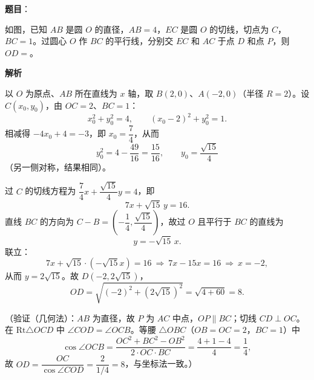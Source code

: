 \begin{answer}

\textbf{题目}：

如图，已知 \(AB\) 是圆 \(O\) 的直径，\(AB=4\)，\(EC\) 是圆 \(O\) 的切线，切点为 \(C\)，\(BC=1\)。过圆心 \(O\) 作 \(BC\) 的平行线，分别交 \(EC\) 和 \(AC\) 于点 \(D\) 和点 \(P\)，则 \(OD=\)\gkblank{}。
\nopagebreak[4]
\begin{center}\end{center}
\nopagebreak[4]
\textbf{解析}

以 \(O\) 为原点、\(AB\) 所在直线为 \(x\) 轴，取 \(B(2,0)\)、\(A(-2,0)\)（半径 \(R=2\)）。设 \(C(x_0,y_0)\)，由 \(OC=2\)、\(BC=1\)：
\nopagebreak[4]
\[
x_0^2+y_0^2=4,\qquad (x_0-2)^2+y_0^2=1.
\]
相减得 \(-4x_0+4=-3\)，即 \(x_0=\dfrac74\)，从而
\nopagebreak[4]
\[
y_0^2=4-\frac{49}{16}=\frac{15}{16},\qquad y_0=\frac{\sqrt{15}}{4}
\]
（另一侧对称，结果相同）。

过 \(C\) 的切线方程为 \(\dfrac74x+\dfrac{\sqrt{15}}4y=4\)，即
\nopagebreak[4]
\[
7x+\sqrt{15}\,y=16.
\]
直线 \(BC\) 的方向为 \(C-B=\left(-\dfrac14,\dfrac{\sqrt{15}}4\right)\)，故过 \(O\) 且平行于 \(BC\) 的直线为
\nopagebreak[4]
\[
y=-\sqrt{15}\,x.
\]
联立：
\nopagebreak[4]
\[
7x+\sqrt{15}\cdot(-\sqrt{15}x)=16
\ \Longrightarrow\ 7x-15x=16
\ \Longrightarrow\ x=-2,
\]
从而 \(y=2\sqrt{15}\)。故 \(D(-2,2\sqrt{15})\)，
\nopagebreak[4]
\[
OD=\sqrt{(-2)^2+(2\sqrt{15})^2}=\sqrt{4+60}=8.
\]

（验证（几何法）：\(AB\) 为直径，故 \(P\) 为 \(AC\) 中点，\(OP\parallel BC\)；切线 \(CD\perp OC\)。在 \(\mathrm{Rt}\triangle OCD\) 中 \(\angle COD=\angle OCB\)。等腰 \(\triangle OBC\)（\(OB=OC=2\)，\(BC=1\)）中
\nopagebreak[4]
\[
\cos\angle OCB=\frac{OC^2+BC^2-OB^2}{2\cdot OC\cdot BC}=\frac{4+1-4}{4}=\frac14,
\]
故 \(OD=\dfrac{OC}{\cos\angle COD}=\dfrac{2}{1/4}=8\)，与坐标法一致。）


\end{answer}
